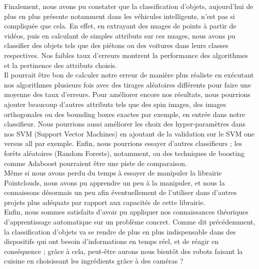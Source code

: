 Finalement, nous avons pu constater que la classification d'objets, aujourd'hui de plus en plus présente notamment dans les véhicules intelligents, n'est pas si compliquée que cela. En effet, en extrayant des nuages de points à partir de vidéos, puis en calculant de simples attributs sur ces nuages, nous avons pu classifier des objets tels que des piétons ou des voitures dans leurs classes respectives. Nos faibles taux d'erreurs montrent la performance des algorithmes et la pertinence des attributs choisis. \\

Il pourrait être bon de calculer notre erreur de manière plus réaliste en exécutant nos algorithmes plusieurs fois avec des tirages aléatoires différents pour faire une moyenne des taux d'erreurs. Pour améliorer encore nos résultats, nous pourrions ajouter beaucoup d'autres attributs tels que des spin images, des images orthogonales ou des bounding boxes exactes par exemple, en entrée dans notre classifieur. Nous pourrions aussi améliorer les choix des hyper-paramètres dans nos SVM (Support Vector Machines) en ajoutant de la validation sur le SVM one versus all par exemple. Enfin, nous pourrions essayer d'autres classifieurs ; les forêts aléatoires (Random Forests), notamment, ou des techniques de boosting comme Adaboost pourraient être une piste de comparaison.\\

Même si nous avons perdu du temps à essayer de manipuler la librairie Pointclouds, nous avons pu apprendre un peu à la manipuler, et nous la connaissons désormais un peu afin éventuellement de l'utiliser dans d'autres projets plus adéquats par rapport aux capacités de cette librairie.\\

Enfin, nous sommes satisfaits d'avoir pu appliquer nos connaissances théoriques d'apprentissage automatique sur un problème concret. Comme dit précédemment, la classification d'objets va se rendre de plus en plus indispensable dans des dispositifs qui ont besoin d'informations en temps réel, et de réagir en conséquence ; grâce à cela, peut-être aurons nous bientôt des robots faisant la cuisine en choisissant les ingrédients grâce à des caméras ?\\